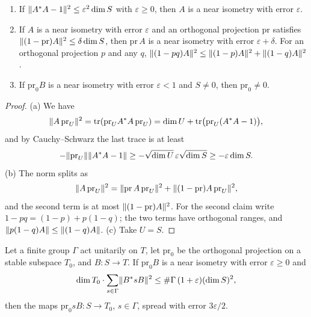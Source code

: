 \begin{lemma}\label{lem:near-isometry}
\begin{enumerate}[label=\textup{(\alph*)}]
\item If $\lVert A^*A-1\rVert^2\le\varepsilon^2\dim S$ with $\varepsilon\ge0$, then $A$ is a near isometry with error $\varepsilon$.
\item If $A$ is a near isometry with error $\varepsilon$ and an orthogonal projection $\mathrm{pr}$ satisfies $\lVert (1-\mathrm{pr})A\rVert^2\le\delta\dim S$, then $\mathrm{pr}\,A$ is
a near isometry with error $\varepsilon+\delta$. For an orthogonal projection $p$ and any $q$, $\lVert (1-pq)A\rVert^2\le\lVert (1-p)A\rVert^2+\lVert (1-q)A\rVert^2$.
\item If $\mathrm{pr}_0B$ is a near isometry with error $\varepsilon<1$ and $S\ne0$, then $\mathrm{pr}_0\ne0$.
\end{enumerate}
\end{lemma}

\begin{proof}
(a) We have
\[
  \lVert A\,\mathrm{pr}_U\rVert^2=\operatorname{tr}(\mathrm{pr}_UA^*A\,\mathrm{pr}_U)=\dim U+\operatorname{tr}\bigl(\mathrm{pr}_U(A^*A-1)\bigr),
\]
and by Cauchy--Schwarz the last trace is at least
\[
  -\lVert \mathrm{pr}_U\rVert\lVert A^*A-1\rVert\ge-\sqrt{\dim U}\,\varepsilon\sqrt{\dim S}\ge-\varepsilon\dim S.
\]
(b) The norm splits as
\[
  \lVert A\,\mathrm{pr}_U\rVert^2=\lVert \mathrm{pr}\,A\,\mathrm{pr}_U\rVert^2+\lVert (1-\mathrm{pr})A\,\mathrm{pr}_U\rVert^2,
\]
and the second term is at most $\lVert (1-\mathrm{pr})A\rVert^2$. For the second claim write $1-pq=(1-p)+p(1-q)$; the two terms have orthogonal ranges, and $\lVert p(1-q)A\rVert\le\lVert (1-q)A\rVert$.
(c) Take $U=S$.
\end{proof}

\begin{theorem}\label{thm:one-translate}
Let a finite group $\Gamma$ act unitarily on $T$, let $\mathrm{pr}_0$ be the orthogonal projection on a stable subspace $T_0$, and $B\colon S\to T$. If $\mathrm{pr}_0B$ is a near
isometry with error $\varepsilon\ge0$ and
\[
  \dim T_0\cdot\sum_{s\in\Gamma}\lVert B^*sB\rVert^2\le\#\Gamma\,(1+\varepsilon)(\dim S)^2,
\]
then the maps $\mathrm{pr}_0sB\colon S\to T_0$, $s\in\Gamma$, spread with error $3\varepsilon/2$.
\end{theorem}


